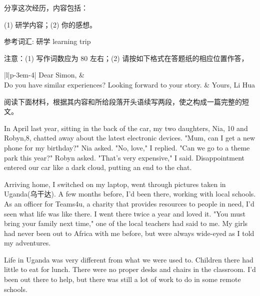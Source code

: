\documentclass{英语试卷}
\begin{document}
\par 分享这次经历，内容包括：\par
\par (1) 研学内容；(2) 你的感想。\par
\par 参考词汇: 研学 learning trip\par
\par 注意：(1) 写作词数应为 80 左右；(2) 请按如下格式在答题纸的相应位置作答，\par
\par\vspace{0.4em}
\begin{center}\begin{tabular}{{|l|p{\dimexpr\linewidth-3em-4\tabcolsep}|}}
\hline
Dear Simon, &  \\
Do you have similar experiences? Looking forward to your story. & Yours, Li Hua \\
\hline
\end{tabular}\end{center}
\vspace{0.4em}
\par 阅读下面材料，根据其内容和所给段落开头语续写两段，使之构成一篇完整的短文。\par
\par In April last year, sitting in the back of the car, my two daughters, Nia, 10 and Robyn,8, chatted away about the latest electronic devices. "Mum, can I get a new phone for my birthday?" Nia asked. "No, love," I replied. "Can we go to a theme park this year?" Robyn asked. "That's very expensive," I said. Disappointment entered our car like a dark cloud, putting an end to the chat.\par
\par Arriving home, I switched on my laptop, went through pictures taken in Uganda(乌干达). A few months before, I'd been there, working with local schools. As an officer for Teams4u, a charity that provides resources to people in need, I'd seen what life was like there. I went there twice a year and loved it. "You must bring your family next time," one of the local teachers had said to me. My girls had never been out to Africa with me before, but were always wide-eyed as I told my adventures.\par
\par Life in Uganda was very different from what we were used to. Children there had little to eat for lunch. There were no proper desks and chairs in the classroom. I'd been out there to help, but there was still a lot of work to do in some remote schools.\par
\end{document}
